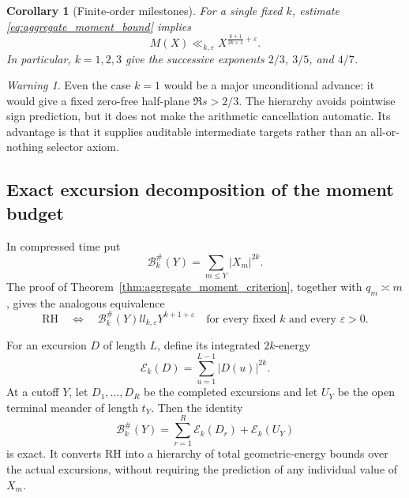 \documentclass[11pt]{amsart}
\numberwithin{equation}{section}
\theoremstyle{plain}
\newtheorem{corollary}[theorem]{Corollary}
\theoremstyle{definition}
\theoremstyle{remark}
\newtheorem{warning}[theorem]{Warning}
\newcommand{\Mert}{M}
\newcommand{\eps}{\varepsilon}
\begin{document}
\begin{corollary}[Finite-order milestones]
\label{cor:finite_order_milestones}
For a single fixed $k$, estimate \eqref{eq:aggregate_moment_bound} implies
\begin{equation}
\Mert(X)
\ll_{k,\eps}
X^{\frac{k+1}{2k+1}+\eps}.
\label{eq:finite_order_exponent}
\end{equation}
In particular, $k=1,2,3$ give the successive exponents
$2/3$, $3/5$, and $4/7$.
\end{corollary}

\begin{warning}
\label{warn:finite_moment_depth}
Even the case $k=1$ would be a major unconditional advance: it would give a
fixed zero-free half-plane $\Re s>2/3$.  The hierarchy avoids pointwise sign
prediction, but it does not make the arithmetic cancellation automatic.
Its advantage is that it supplies auditable intermediate targets rather than
an all-or-nothing selector axiom.
\end{warning}

\subsection{Exact excursion decomposition of the moment budget}

In compressed time put
\begin{equation}
\mathcal B_k^{\#}(Y)=\sum_{m\leq Y}|X_m|^{2k}.
\label{eq:compressed_time_moment}
\end{equation}
The proof of Theorem~\ref{thm:aggregate_moment_criterion}, together with
$q_m\asymp m$, gives the analogous equivalence
\begin{equation}
\mathrm{RH}
\quad\Longleftrightarrow\quad
\mathcal B_k^{\#}(Y)ll_{k,\eps}Y^{k+1+\eps}
\quad\text{for every fixed $k$ and every $\eps>0$}.
\label{eq:compressed_moment_equivalence}
\end{equation}

For an excursion $D$ of length $L$, define its integrated $2k$-energy
\begin{equation}
\mathcal E_k(D)=\sum_{u=1}^{L-1}|D(u)|^{2k}.
\label{eq:excursion_integrated_energy}
\end{equation}
At a cutoff $Y$, let $D_1,\ldots,D_R$ be the completed excursions and let
$U_Y$ be the open terminal meander of length $t_Y$.  Then the identity
\begin{equation}
\boxed{
\mathcal B_k^{\#}(Y)
=
\sum_{r=1}^{R}\mathcal E_k(D_r)
+\mathcal E_k(U_Y)
}
\label{eq:exact_excursion_moment_decomposition}
\end{equation}
is exact.  It converts RH into a hierarchy of total geometric-energy bounds
over the actual excursions, without requiring the prediction of any
individual value of $X_m$.
\end{document}
